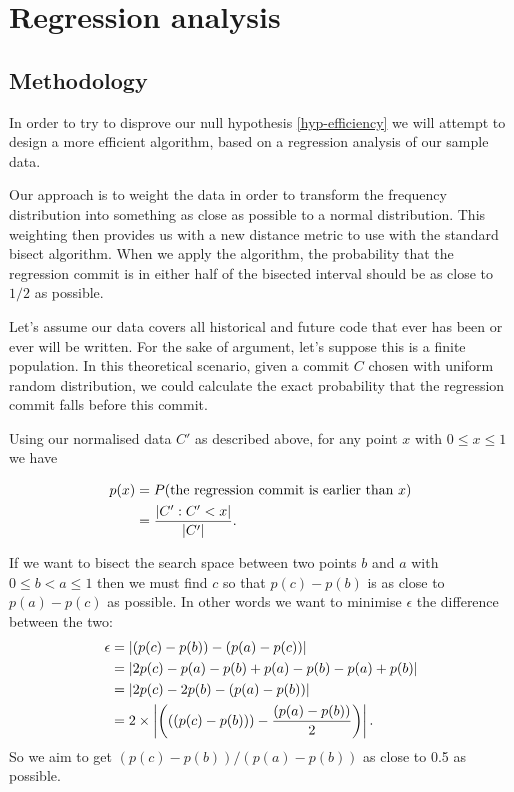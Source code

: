 \documentclass[10pt,journal,compsoc]{IEEEtran}
\begin{document}
\section{Regression analysis}
\label{section-regression}

\subsection{Methodology}

In order to try to disprove our null hypothesis \ref{hyp-efficiency} we will attempt to design a more efficient algorithm, based on a regression analysis of our sample data.

Our approach is to weight the data in order to transform the frequency distribution into something as close as possible to a normal distribution. This weighting then provides us with a new distance metric to use with the standard bisect algorithm. When we apply the algorithm, the probability that the regression commit is in either half of the bisected interval should be as close to $1/2$ as possible.

Let's assume our data covers all historical and future code that ever has been or ever will be written. For the sake of argument, let's suppose this is a finite population. In this theoretical scenario, given a commit $C$ chosen with uniform random distribution, we could calculate the exact probability that the regression commit falls before this commit.

Using our normalised data $C'$ as described above, for any point $x$ with $0 \le x \le 1$ we have

\begin{align*}
p(x) & = P( \text{the regression commit is earlier than } x) \\
    & = \frac{\left|  C' : C' < x  \right|}{ \left|  C'  \right|} .
\end{align*}

If we want to bisect the search space between two points $b$ and $a$ with $0 \le b < a \le 1$ then we must find $c$ so that $p(c) - p(b)$ is as close to $p(a) - p(c)$ as possible. In other words we want to minimise $\epsilon$ the difference between the two:
\begin{align*}
\epsilon & = \left| (p(c) - p(b)) - (p(a) - p(c)) \right| \\
         & = \left| 2p(c) - p(a) - p(b) + p(a) - p(b) - p(a) + p(b) \right| \\
         & = \left| 2p(c) - 2p(b) - (p(a) - p(b)) \right| \\
         & = 2 \times \left| \left(((p(c) - p(b))) - \frac{(p(a) - p(b))}{2} \right) \right| .
\end{align*}
So we aim to get $(p(c) - p(b)) / (p(a) - p(b))$ as close to 0.5 as possible.
\end{document}
